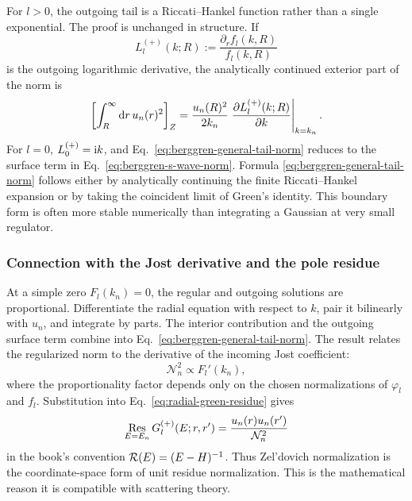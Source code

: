 For $l>0$, the outgoing tail is a Riccati--Hankel function rather than a
single exponential.  The proof is unchanged in structure.  If
\begin{equation}
  L_l^{(+)}(k;R)
  :=\frac{\partial_r f_l(k,R)}{f_l(k,R)}
  \label{eq:outgoing-log-derivative}
\end{equation}
is the outgoing logarithmic derivative, the analytically continued exterior
part of the norm is
\begin{equation}
  \left[\int_R^\infty\mathrm{d} r\,u_n(r)^2\right]_Z
  =\frac{u_n(R)^2}{2k_n}
  \left.\frac{\partial L_l^{(+)}(k;R)}{\partial k}
  \right|_{k=k_n} .
  \label{eq:berggren-general-tail-norm}
\end{equation}
For $l=0$, $L_0^{(+)}=\mathrm{i} k$, and
Eq.~\eqref{eq:berggren-general-tail-norm} reduces to the surface term in
Eq.~\eqref{eq:berggren-s-wave-norm}.  Formula
\eqref{eq:berggren-general-tail-norm} follows either by analytically
continuing the finite Riccati--Hankel expansion or by taking the coincident
limit of Green's identity.  This boundary form is often more stable
numerically than integrating a Gaussian at very small regulator.

\subsubsection*{Connection with the Jost derivative and the pole residue}

At a simple zero $F_l(k_n)=0$, the regular and outgoing solutions are
proportional.  Differentiate the radial equation with respect to $k$, pair it
bilinearly with $u_n$, and integrate by parts.  The interior contribution and
the outgoing surface term combine into Eq.~\eqref{eq:berggren-general-tail-norm}.
The result relates the regularized norm to the derivative of the incoming
Jost coefficient:
\begin{equation}
  \mathcal N_n^2
  \propto F_l'(k_n),
  \label{eq:berggren-jost-derivative}
\end{equation}
where the proportionality factor depends only on the chosen normalizations of
$\varphi_l$ and $f_l$.  Substitution into
Eq.~\eqref{eq:radial-green-residue} gives
\begin{equation}
  \operatorname*{Res}_{E=E_n}G_l^{(+)}(E;r,r')
  =\frac{u_n(r)u_n(r')}{\mathcal N_n^2}
  \label{eq:berggren-residue-normalization}
\end{equation}
in the book's convention $\mathcal{R}(E)=(E-H)^{-1}$.  Thus Zel'dovich normalization is
the coordinate-space form of unit residue normalization.  This is the
mathematical reason it is compatible with scattering theory.

